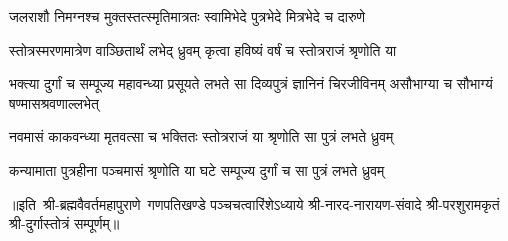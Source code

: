 \twolineshloka
{जलराशौ निमग्नश्च मुक्तस्तत्स्मृतिमात्रतः}
{स्वामिभेदे पुत्रभेदे मित्रभेदे च दारुणे}

\twolineshloka
{स्तोत्रस्मरणमात्रेण वाञ्छितार्थं लभेद् ध्रुवम्}
{कृत्वा हविष्यं वर्षं च स्तोत्रराजं श्रृणोति या}

\threelineshloka
{भक्त्या दुर्गां च सम्पूज्य महावन्ध्या प्रसूयते}
{लभते सा दिव्यपुत्रं ज्ञानिनं चिरजीविनम्}
{असौभाग्या च सौभाग्यं षण्मासश्रवणाल्लभेत्}

\twolineshloka
{नवमासं काकवन्ध्या मृतवत्सा च भक्तितः}
{स्तोत्रराजं या श्रृणोति सा पुत्रं लभते ध्रुवम्}

\twolineshloka
{कन्यामाता पुत्रहीना पञ्चमासं श्रृणोति या}
{घटे सम्पूज्य दुर्गां च सा पुत्रं लभते ध्रुवम्}


{॥इति~श्री-ब्रह्मवैवर्तमहापुराणे~गणपतिखण्डे पञ्चचत्वारिंशेऽध्याये श्री-नारद-नारायण-संवादे श्री-परशुरामकृतं श्री-दुर्गास्तोत्रं सम्पूर्णम्॥}